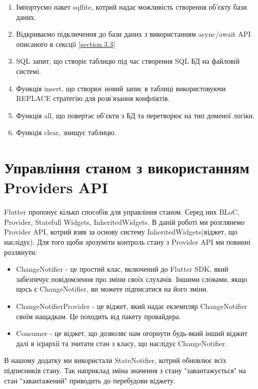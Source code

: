 \begin{enumerate}
    \item Імпортуємо пакет sqflite, котрий надає можливість створення об'єкту бази даних.
    \item Відкриваємо підключення до бази даних з використанням async/await API описаного в сексції \ref{section.3.3}
    \item SQL запит, що створіє таблицю під час створення SQL БД на файловій системі.
    \item Функція insert, що створює новий запис в таблиці використовуючи REPLACE стратегію для розв'язання конфліктів.
    \item Функція all, що повертає об'єкти з БД та перетворює на тип доменої логіки.
    \item Функція clear, знищує таблицю.
\end{enumerate}


\section{Управління станом з використанням Providers API}
\label{section.3.5}
Flutter пропонує кількп способів для управління станом. Серед них BLoC, Provider, Statefull Widgets, InheritedWidgets.
В даній роботі ми розглянемо Provider API, котрий взяв за основу систему InheritedWidgets(віджет, що наслідує).
Для того щоби зрозуміти контроль стану з Provider API ми повинні розлянути:

\begin{itemize}
    \item ChangeNotifier - це простий клас, включений до Flutter SDK, який забезпечує повідомлення про зміни своїх слухачів. Іншими словами, якщо щось є ChangeNotifier, ви можете підписатися на його зміни.
    \item ChangeNotifierProvider - це віджет, який надає екземпляр ChangeNotifier своїм нащадкам. Це походить від пакету провайдера.
    \item Consumer - це віджет, що дозволяє нам огорнути будь-який інший віджит далі в ієрархії та зчитати стан з класу, що наслідує ChangeNotifier.
\end{itemize}

В нашому додатку ми використали StateNotifier, котрий обновлює всіх підписників стану.
Так наприклад зміна значення з стану "завантажується" на стан "завантажений" приводить до перебудови віджету.


